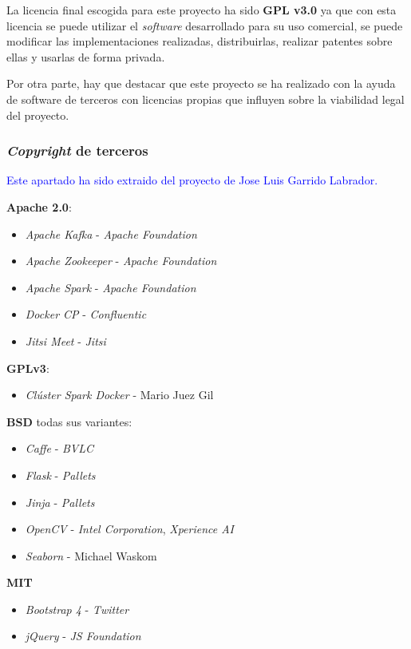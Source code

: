 La licencia final escogida para este proyecto ha sido \textbf{GPL v3.0} ya que con esta licencia se puede utilizar el \textit{software} desarrollado para su uso comercial, se puede modificar las implementaciones realizadas,
distribuirlas, realizar patentes sobre ellas y usarlas de forma privada.

Por otra parte, hay que destacar que este proyecto se ha realizado con la ayuda de software de terceros con licencias propias que influyen sobre la viabilidad legal del proyecto.

\subsubsection{\textit{Copyright} de terceros}
\textcolor{blue}{Este apartado ha sido extraido del proyecto de Jose Luis Garrido Labrador.}

\textbf{Apache 2.0}:
\begin{itemize}
	\item \textit{Apache Kafka} - \textit{Apache Foundation}
	\item \textit{Apache Zookeeper} - \textit{Apache Foundation}
	\item \textit{Apache Spark} - \textit{Apache Foundation}
	\item \textit{Docker CP} - \textit{Confluentic}
	\item \textit{Jitsi Meet} - \textit{Jitsi}
\end{itemize}

\textbf{GPLv3}:
\begin{itemize}
	\item \textit{Clúster Spark Docker} - Mario Juez Gil
\end{itemize}

\textbf{BSD} todas sus variantes:
\begin{itemize}
	\item \textit{Caffe} - \textit{BVLC}
	\item \textit{Flask} - \textit{Pallets}
	\item \textit{Jinja} - \textit{Pallets}
	\item \textit{OpenCV} - \textit{Intel Corporation}, \textit{Xperience AI}
	\item \textit{Seaborn} - Michael Waskom
\end{itemize}

\textbf{MIT}
\begin{itemize}
	\item \textit{Bootstrap 4} - \textit{Twitter}
	\item \textit{jQuery} - \textit{JS Foundation}
\end{itemize}